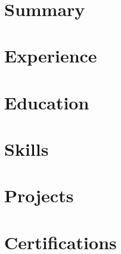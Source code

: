 \documentclass[11pt,a4paper]{article}
\begin{document}
\begin{center}
{\LARGE \textbf{
}}\\[6pt]
\end{center}

\section{Summary}

\section{Experience}

\section{Education}

\section{Skills}

\section{Projects}

\section{Certifications}
\end{document}
